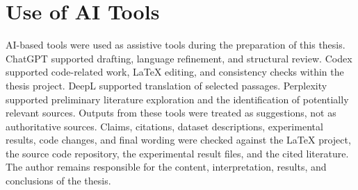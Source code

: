 \cleardoublepage
\chapter*{Use of AI Tools}

AI-based tools were used as assistive tools during the preparation of this thesis. ChatGPT supported drafting, language refinement, and structural review. Codex supported code-related work, LaTeX editing, and consistency checks within the thesis project. DeepL supported translation of selected passages. Perplexity supported preliminary literature exploration and the identification of potentially relevant sources. Outputs from these tools were treated as suggestions, not as authoritative sources. Claims, citations, dataset descriptions, experimental results, code changes, and final wording were checked against the LaTeX project, the source code repository, the experimental result files, and the cited literature. The author remains responsible for the content, interpretation, results, and conclusions of the thesis.

